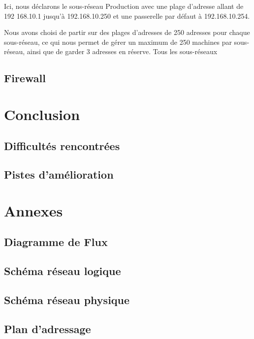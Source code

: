 \documentclass[a4paper,12pt]{report}
\begin{document}
                Ici, nous déclarons le sous-réseau Production avec une plage d'adresse allant de 192
                168.10.1 jusqu'à 192.168.10.250 et une passerelle par défaut à 192.168.10.254.

                Nous avons choisi de partir sur des plages d'adresses de 250 adresses pour chaque sous-réseau, ce qui nous permet de gérer un maximum de 250 machines par sous-réseau, ainsi que de garder 3 adresses en réserve.
                Tous les sous-réseaux 



        \section{Firewall}
        \section{}


    \chapter{Conclusion}
        \section{Difficultés rencontrées}
        \section{Pistes d'amélioration}

    \chapter*{Annexes}
        \section{Diagramme de Flux}
        \section{Schéma réseau logique}
        \section{Schéma réseau physique}
        \section{Plan d'adressage}
        
\end{document}
